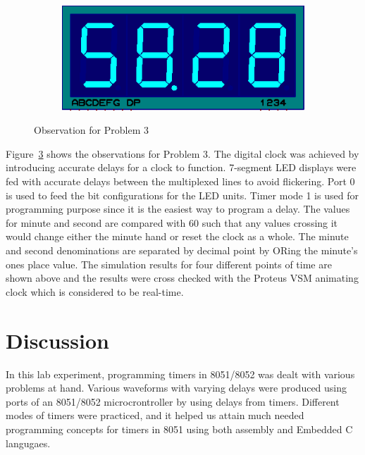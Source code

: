 \documentclass{lab_sheet}
\begin{document}
\begin{figure}[H]
\begin{subfigure}{.5\textwidth}
                \caption{}
                \label{fig:prob3_c}
                \end{subfigure}
                \begin{subfigure}{.5\textwidth}
                    \centering
                    \includegraphics[width=.8\linewidth,frame]{../Figures/3d}
                    \caption{}
                    \label{fig:prob3_d}
                    \end{subfigure}
                    \caption{Observation for Problem 3}
                    \label{fig:prob3}
    \end{figure}
    Figure~\ref{fig:prob3} shows the observations for Problem 3. The digital clock was achieved by introducing accurate delays for a clock to function. 7-segment LED displays were fed with accurate delays between the multiplexed lines to avoid flickering. Port 0 is used to feed the bit configurations for the LED units. Timer mode 1 is used for programming purpose since it is the easiest way to program a delay. The values for minute and second are compared with 60 such that any values crossing it would change either the minute hand or reset the clock as a whole. The minute and second denominations are separated by decimal point by ORing the minute's ones place value. The simulation results for four different points of time are shown above and the results were cross checked with the Proteus VSM animating clock which is considered to be real-time.
    \section{Discussion}
    In this lab experiment, programming timers in 8051/8052 was dealt with various problems at hand. Various waveforms with varying delays were produced using ports of an 8051/8052 microcrontroller by using delays from timers. Different modes of timers were practiced, and it helped us attain much needed programming concepts for timers in 8051 using both assembly and Embedded C langugaes.
    \pagebreak
    \printbibliography[heading=bibintoc,title={Additional References},notcategory=cited]
\end{document}
